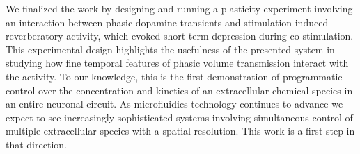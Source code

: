 We finalized the work by designing and running a plasticity experiment involving an interaction between phasic dopamine transients and stimulation induced reverberatory activity, which evoked short-term depression during co-stimulation. This experimental design highlights the usefulness of the presented system in studying how fine temporal features of phasic volume transmission interact with the activity. To our knowledge, this is the first demonstration of programmatic control over the concentration and kinetics of an extracellular chemical species in an entire neuronal circuit. As microfluidics technology continues to advance we expect to see increasingly sophisticated systems involving simultaneous control of multiple extracellular species with a spatial resolution. This work is a first step in that direction.

